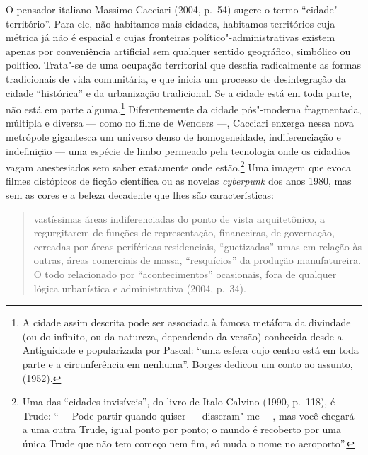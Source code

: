 O pensador italiano Massimo Cacciari (2004, p.~54) sugere o termo
``cidade"-território''. Para ele, não habitamos mais cidades, habitamos
territórios cuja métrica já não é espacial e cujas fronteiras
político"-administrativas existem apenas por conveniência artificial sem
qualquer sentido geográfico, simbólico ou político. Trata"-se de uma
ocupação territorial que desafia radicalmente as formas tradicionais de
vida comunitária, e que inicia um processo de desintegração da cidade
``histórica'' e da urbanização tradicional. Se a cidade está em toda
parte, não está em parte alguma.\footnote{A cidade assim descrita pode
  ser associada à famosa metáfora da divindade (ou do infinito, ou da
  natureza, dependendo da versão) conhecida desde a Antiguidade e
  popularizada por Pascal: ``uma esfera cujo centro está em toda parte e
  a circunferência em nenhuma''. Borges dedicou um conto ao assunto,
  {} (1952).} Diferentemente da cidade
pós"-moderna fragmentada, múltipla e diversa --- como no filme de Wenders
---, Cacciari enxerga nessa nova metrópole gigantesca um universo denso
de homogeneidade, indiferenciação e indefinição --- uma espécie de limbo
permeado pela tecnologia onde os cidadãos vagam anestesiados sem saber
exatamente onde estão.\footnote{Uma das ``cidades invisíveis'', do livro
  de Italo Calvino (1990, p.~118), é Trude: ``--- Pode partir quando
  quiser --- disseram"-me ---, mas você chegará a uma outra Trude, igual
  ponto por ponto; o mundo é recoberto por uma única Trude que não tem
  começo nem fim, só muda o nome no aeroporto''.} Uma imagem que evoca
filmes distópicos de ficção científica ou as novelas \emph{cyberpunk}
dos anos 1980, mas sem as cores e a beleza decadente que lhes são
características:

\begin{quote}
vastíssimas áreas indiferenciadas do ponto de vista arquitetônico, a
regurgitarem de funções de representação, financeiras, de governação,
cercadas por áreas periféricas residenciais, ``guetizadas'' umas em
relação às outras, áreas comerciais de massa, ``resquícios'' da produção
manufatureira. O todo relacionado por ``acontecimentos'' ocasionais, fora
de qualquer lógica urbanística e administrativa (2004, p.~34).
\end{quote}

